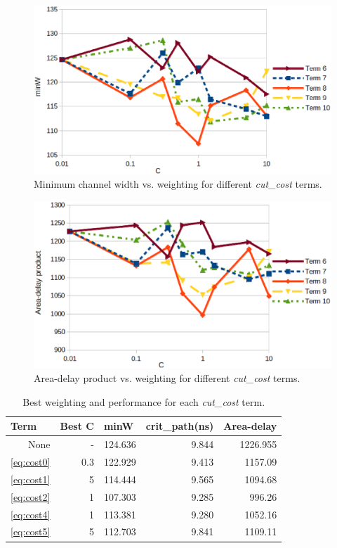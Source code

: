 \documentclass{sig-alternate-2013}
\begin{document}
\begin{figure}[!htbp]
\centering
\includegraphics[width=\linewidth]{minW_constant_sweep_log.eps}
\caption{Minimum channel width vs. weighting for different \textit{cut\_cost} terms.}
\label{fig:minW_constant_sweep}
\end{figure}

\begin{figure}[!htbp]
\centering
\includegraphics[width=\linewidth]{areadelay_constant_sweep_log.eps}
\caption{Area-delay product vs. weighting for different \textit{cut\_cost} terms.}
\label{fig:areadelay_constant_sweep}
\end{figure}

\begin{table}[htbp]
\begin{tabular}{|r|r|r|r|r|}
\hline
\multicolumn{1}{|l|}{Term} & \multicolumn{1}{l|}{Best C} & \multicolumn{1}{l|}{minW} & \multicolumn{1}{l|}{crit\_path(ns)} & \multicolumn{1}{l|}{Area-delay} \\ \hline \hline
None & - & 124.636 & 9.844 & 1226.955 \\ \hline
\ref{eq:cost0} & 0.3 & 122.929 & 9.413 & 1157.09 \\ \hline
\ref{eq:cost1} & 5 & 114.444 & 9.565 & 1094.68 \\ \hline
\ref{eq:cost2} & 1 & 107.303 & 9.285 & 996.26 \\ \hline
\ref{eq:cost4} & 1 & 113.381 & 9.280 & 1052.16 \\ \hline
\ref{eq:cost5} & 5 & 112.703 & 9.841 & 1109.11 \\ \hline
\end{tabular}
\caption{Best weighting and performance for each \textit{cut\_cost} term.}
\label{table:constant_sweep}
\end{table}
\end{document}

